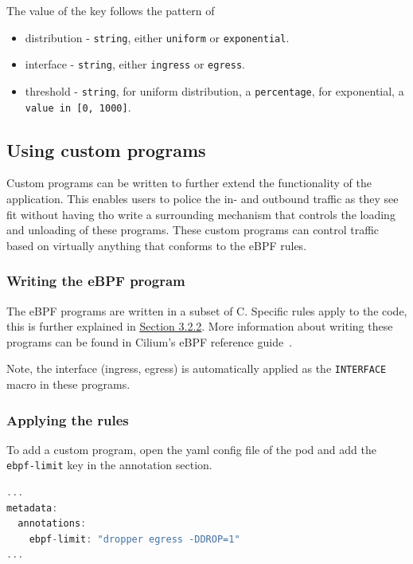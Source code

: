 \noindent
The value of the key follows the pattern of

\begin{itemize}
	\item distribution - \texttt{string}, either \texttt{uniform} or \texttt{exponential}.
	\item interface - \texttt{string}, either \texttt{ingress} or \texttt{egress}.
	\item threshold - \texttt{string}, for uniform distribution, a \texttt{percentage}, for exponential, a \texttt{value in [0, 1000]}.
\end{itemize}

\subsection{Using custom programs}
Custom programs can be written to further extend the functionality of the application. 
This enables users to police the in- and outbound traffic as they see fit without having tho write a surrounding mechanism that controls the loading and unloading of these programs. These custom programs can control traffic based on virtually anything that conforms to the eBPF rules.

\subsubsection{Writing the eBPF program}
The eBPF programs are written in a subset of C. Specific rules apply to the code, this is further explained in \underline{\hyperref[sec:ebpfrules]{Section 3.2.2}}.
More information about writing these programs can be found in Cilium's eBPF reference guide~\cite{ebpfref}.

Note, the interface (ingress, egress) is automatically applied as the \texttt{INTERFACE} macro in these programs.

\subsubsection{Applying the rules}
To add a custom program, open the yaml config file of the pod and add the \texttt{ebpf-limit} key in the annotation section.

\begin{lstlisting}[language={C++}]
...
metadata:
  annotations:
    ebpf-limit: "dropper egress -DDROP=1"
...
\end{lstlisting}

